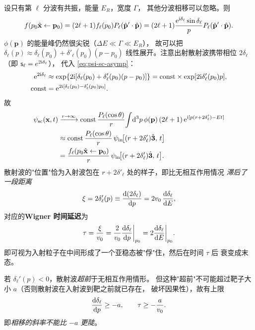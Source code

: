 设只有第 $\ell$ 分波有共振，能量 $E_R$，宽度 $\Gamma$，
其他分波相移可以忽略。则
\begin{equation}
  f(p_0\hat{\mathbf x}\leftarrow\mathbf p_0)
  =(2\ell+1)f_\ell(p_0)P_\ell(\hat{\mathbf p}'\cdot\hat{\mathbf p})
  =(2\ell+1)\frac{\mathrm{e}^{\mathrm{i}\delta_\ell}\sin\delta_\ell}{p}P_\ell(\hat{\mathbf p}'\cdot\hat{\mathbf p}).
\end{equation}
$\phi(\mathbf p)$ 的能量峰仍然很尖锐（$\Delta E\ll\Gamma\ll E_R$），
故可以把 $\delta_\ell(p)\approx\delta_\ell(p_0)+\delta'_\ell(p_0)(p-p_0)$
线性展开。注意出射散射波携带相位 $2\delta_\ell$（即 $\mathsf{s}_\ell=e^{2\mathrm{i}\delta_\ell}$），
代入 \eqref{eq:psi-sc-asymp}：
\begin{align}
  \mathrm{e}^{2\mathrm{i}\delta_\ell}&\approx \exp\{2\mathrm{i}[\delta_\ell(p_0)+\delta'_\ell(p_0)(p-p_0)]\}
  =\mathrm{const}\times \exp[2\mathrm{i}\delta'_\ell(p_0) p],\nonumber\\
  \mathrm{const}&=\mathrm{e}^{2\mathrm{i}[\delta_\ell(p_0)-\delta'_\ell(p_0)p_0]}.
\end{align}
故
\begin{align}
  \psi_{\mathrm{sc}}(\mathbf x,t)
  &\xrightarrow{r\to\infty}\mathrm{const}\,\frac{P_\ell(\cos\theta)}{r}\!\int\!\mathrm{d}^3 p\,\phi(\mathbf p)\,(2\ell+1)\,
    \mathrm{e}^{\mathrm{i}[p(r+2\delta'_\ell)-Et]}\nonumber\\
  &\approx \mathrm{const}\,\frac{P_\ell(\cos\theta)}{r}\,
    \psi_{\mathrm{in}}\!\big[(r+2\delta'_\ell)\hat{\mathbf 3},\,t\big]\nonumber\\
  &= \frac{f_\ell(p_0\hat{\mathbf x}\leftarrow\mathbf p_0)}{r}\,
    \psi_{\mathrm{in}}\!\big[(r+2\delta'_\ell)\hat{\mathbf 3},\,t\big].
\end{align}
散射波的"位置"恰为入射波包在 $r+2\delta'_\ell$ 处的样子，即比无相互作用情况
\emph{滞后了一段距离}
\begin{equation}\label{eq:wigner-xi}
  \xi=2\delta'_\ell(p)\equiv\frac{\mathrm{d}(2\delta_\ell)}{\mathrm{d} p}=2v_0\,\frac{\mathrm{d}\delta_\ell}{\mathrm{d} E},
\end{equation}
对应的\textbf{Wigner 时间延迟}为
\begin{equation}\label{eq:wigner-tau}
  \tau=\frac{\xi}{v_0}=\frac{2}{v_0}\frac{\mathrm{d}\delta_\ell}{\mathrm{d} p}\bigg|_{p_0}
  =2\frac{\mathrm{d}\delta_\ell}{\mathrm{d} E}\bigg|_{p_0}.
\end{equation}
即可视为入射粒子在中间形成了一个亚稳态被"俘"住，然后在时间 $\tau$ 后
衰变成末态。

\begin{remark}[因果性约束]
  若 $\delta_\ell'(p)<0$，散射波\emph{超前}于无相互作用情形。
  但这种"超前"不可能超过靶子大小 $a$（否则散射波在入射波到靶之前就已存在，
  破坏因果性），故有上限
  \begin{equation}
    \frac{\mathrm{d}\delta_\ell}{\mathrm{d} p}\geq -a,\qquad \tau\geq -\frac{a}{v_0}.
  \end{equation}
  即\emph{相移的斜率不能比 $-a$ 更陡}。
\end{remark}

